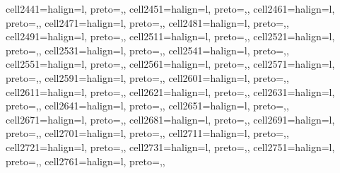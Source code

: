 \begin{table}
\begin{talltblr}
{cell{244}{1}={}{halign=l, preto={\hspace{1em}},},
cell{245}{1}={}{halign=l, preto={\hspace{1em}},},
cell{246}{1}={}{halign=l, preto={\hspace{1em}},},
cell{247}{1}={}{halign=l, preto={\hspace{1em}},},
cell{248}{1}={}{halign=l, preto={\hspace{1em}},},
cell{249}{1}={}{halign=l, preto={\hspace{1em}},},
cell{251}{1}={}{halign=l, preto={\hspace{1em}},},
cell{252}{1}={}{halign=l, preto={\hspace{1em}},},
cell{253}{1}={}{halign=l, preto={\hspace{1em}},},
cell{254}{1}={}{halign=l, preto={\hspace{1em}},},
cell{255}{1}={}{halign=l, preto={\hspace{1em}},},
cell{256}{1}={}{halign=l, preto={\hspace{1em}},},
cell{257}{1}={}{halign=l, preto={\hspace{1em}},},
cell{259}{1}={}{halign=l, preto={\hspace{1em}},},
cell{260}{1}={}{halign=l, preto={\hspace{1em}},},
cell{261}{1}={}{halign=l, preto={\hspace{1em}},},
cell{262}{1}={}{halign=l, preto={\hspace{1em}},},
cell{263}{1}={}{halign=l, preto={\hspace{1em}},},
cell{264}{1}={}{halign=l, preto={\hspace{1em}},},
cell{265}{1}={}{halign=l, preto={\hspace{1em}},},
cell{267}{1}={}{halign=l, preto={\hspace{1em}},},
cell{268}{1}={}{halign=l, preto={\hspace{1em}},},
cell{269}{1}={}{halign=l, preto={\hspace{1em}},},
cell{270}{1}={}{halign=l, preto={\hspace{1em}},},
cell{271}{1}={}{halign=l, preto={\hspace{1em}},},
cell{272}{1}={}{halign=l, preto={\hspace{1em}},},
cell{273}{1}={}{halign=l, preto={\hspace{1em}},},
cell{275}{1}={}{halign=l, preto={\hspace{1em}},},
cell{276}{1}={}{halign=l, preto={\hspace{1em}},},
}
\end{talltblr}
\end{table}

